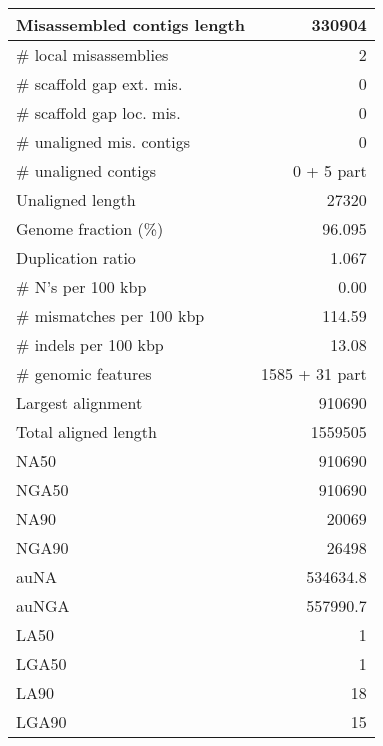 \documentclass[12pt,a4paper]{article}
\begin{document}
\begin{table}[ht]
\begin{center}
\begin{tabular}{|l*{1}{|r}|}
Misassembled contigs length & 330904 \\ \hline
\# local misassemblies & 2 \\ \hline
\# scaffold gap ext. mis. & 0 \\ \hline
\# scaffold gap loc. mis. & 0 \\ \hline
\# unaligned mis. contigs & 0 \\ \hline
\# unaligned contigs & 0 + 5 part \\ \hline
Unaligned length & 27320 \\ \hline
Genome fraction (\%) & 96.095 \\ \hline
Duplication ratio & 1.067 \\ \hline
\# N's per 100 kbp & 0.00 \\ \hline
\# mismatches per 100 kbp & 114.59 \\ \hline
\# indels per 100 kbp & 13.08 \\ \hline
\# genomic features & 1585 + 31 part \\ \hline
Largest alignment & 910690 \\ \hline
Total aligned length & 1559505 \\ \hline
NA50 & 910690 \\ \hline
NGA50 & 910690 \\ \hline
NA90 & 20069 \\ \hline
NGA90 & 26498 \\ \hline
auNA & 534634.8 \\ \hline
auNGA & 557990.7 \\ \hline
LA50 & 1 \\ \hline
LGA50 & 1 \\ \hline
LA90 & 18 \\ \hline
LGA90 & 15 \\ \hline
\end{tabular}
\end{center}
\end{table}
\end{document}
